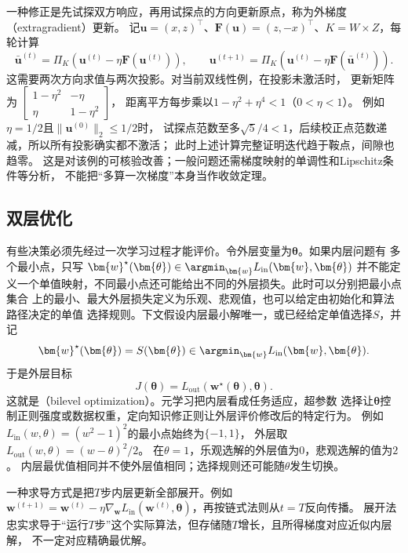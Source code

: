 一种修正是先试探双方响应，再用试探点的方向更新原点，称为外梯度（extragradient）更新。
记$\bm u=(x,z)^\top$、$\bm F(\bm u)=(z,-x)^\top$、$K=W\times Z$，每轮计算
\[
 \bar{\bm u}^{(t)}=\Pi_K(\bm u^{(t)}-\eta\bm F(\bm u^{(t)})),\qquad
 \bm u^{(t+1)}=\Pi_K(\bm u^{(t)}-\eta\bm F(\bar{\bm u}^{(t)})).
\]
这需要两次方向求值与两次投影。对当前双线性例，在投影未激活时，
更新矩阵为
$\left[\begin{smallmatrix}1-\eta^2&-\eta\\ \eta&1-\eta^2\end{smallmatrix}\right]$，
距离平方每步乘以$1-\eta^2+\eta^4<1$（$0<\eta<1$）。
例如$\eta=1/2$且$\|\bm u^{(0)}\|_2\leq1/2$时，
试探点范数至多$\sqrt{5}/4<1$，后续校正点范数递减，所以所有投影确实都不激活；
此时上述计算完整证明迭代趋于鞍点，间隙也趋零。
这是对该例的可核验改善；一般问题还需梯度映射的单调性和Lipschitz条件等分析，
不能把“多算一次梯度”本身当作收敛定理。

\subsection{双层优化}
\label{sec:opt-bilevel}

有些决策必须先经过一次学习过程才能评价。令外层变量为$\bm{\theta}$。如果内层问题有
多个最小点，只写
$\bm{w}^{\star}(\bm{\theta})\in
\argmin_{\bm{w}}L_{\mathrm{in}}(\bm{w},\bm{\theta})$
并不能定义一个单值映射，不同最小点还可能给出不同的外层损失。此时可以分别把最小点集合
上的最小、最大外层损失定义为乐观、悲观值，也可以给定由初始化和算法路径决定的单值
选择规则。下文假设内层最小解唯一，或已经给定单值选择$S$，并记
\[
  \bm{w}^{\star}(\bm{\theta})=S(\bm{\theta})
  \in\argmin_{\bm{w}}L_{\mathrm{in}}(\bm{w},\bm{\theta}).
\]
于是外层目标
\begin{equation}
  J(\bm{\theta})
  =L_{\mathrm{out}}(\bm{w}^{\star}(\bm{\theta}),\bm{\theta}).
  \label{eq:opt-bilevel-objective}
\end{equation}
这就是（bilevel optimization）。元学习把内层看成任务适应，超参数
选择让$\bm{\theta}$控制正则强度或数据权重，定向知识修正则让外层评价修改后的特定行为。
例如$L_{\mathrm{in}}(w,\theta)=(w^2-1)^2$的最小点始终为$\{-1,1\}$，
外层取$L_{\mathrm{out}}(w,\theta)=(w-\theta)^2/2$。
在$\theta=1$，乐观选解的外层值为$0$，悲观选解的值为$2$。
内层最优值相同并不使外层值相同；选择规则还可能随$\theta$发生切换。

一种求导方式是把$T$步内层更新全部展开。例如
$\bm{w}^{(t+1)}=\bm{w}^{(t)}-\eta\nabla_{\bm{w}}
L_{\mathrm{in}}(\bm{w}^{(t)},\bm{\theta})$，再按链式法则从$t=T$反向传播。
展开法忠实求导于“运行$T$步”这个实际算法，但存储随$T$增长，且所得梯度对应近似内层解，
不一定对应精确最优解。

